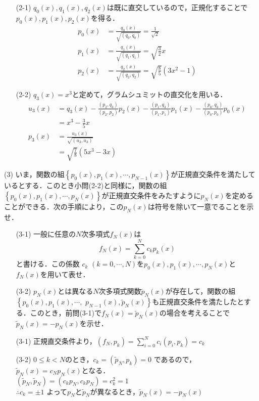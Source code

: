 \documentclass[a4j]{jarticle}
\let \ds \displaystyle
\begin{document}
\begin{itemize}
 \item[(2-1)] $q_0(x),q_1(x),q_2(x)$は既に直交しているので，正規化することで$p_0(x),p_1(x),p_2(x)$を得る．
              \begin{align*}
               p_0(x) &= \frac{q_0(x)}{\sqrt{(q_0,q_0)}} = \frac{1}{\sqrt{2}} \\
               p_1(x) &= \frac{q_1(x)}{\sqrt{(q_1,q_1)}} = \sqrt{\frac{3}{2}} x \\
               p_2(x) &= \frac{q_2(x)}{\sqrt{(q_2,q_2)}} = \sqrt{\frac{8}{5}} (3x^2-1)
              \end{align*}
 \item[(2-2)] $q_3(x)=x^3$と定めて，グラムシュミットの直交化を用いる．
              \begin{align*}
               u_3(x) &= q_3(x) - \frac{(p_2,q_3)}{(p_2,p_2)}p_2(x) - \frac{(p_1,q_3)}{(p_1,p_1)}p_1(x) - \frac{(p_0,q_3)}{(p_0,p_0)}p_0(x) \\
               &= x^3 - \frac{3}{5} x \\
               p_3(x) &= \frac{u_3(x)}{\sqrt{(u_3,u_3)}} \\
               &= \sqrt{\frac{7}{8}}(5x^3 - 3x)
              \end{align*}
\end{itemize}

\begin{screen}
 (3) いま，関数の組$\left\{p_0(x),p_1(x),\cdots,p_{N-1}(x)\right\}$が正規直交条件を満たしているとする．このとき小問(2-2)と同様に，関数の組$\left\{p_0(x),p_1(x),\cdots,p_{N}(x)\right\}$が正規直交条件をみたすように$p_N(x)$を定めることができる．次の手順により，この$p_N(x)$は符号を除いて一意でることを示せ．
 \begin{itemize}
  \item[(3-1)] 一般に任意の$N$次多項式$f_N(x)$は
               $$f_N(x)=\sum_{k=0}^Nc_kp_k(x)$$
               と書ける．この係数 $c_k$ $(k=0,\cdots,N)$を$p_0(x),p_1(x),\cdots,p_{N}(x)$と$f_N(x)$を用いて表せ．
  \item[(3-2)] $p_N(x)$とは異なる$N$次多項式関数$\tilde{p}_N(x)$が存在して，関数の組$\left\{p_0(x),p_1(x),\cdots,\right.$ $\left.p_{N-1}(x),\tilde{p}_{N}(x)\right\}$も正規直交条件を満たしたとする．このとき，前問(3-1)で$f_N(x)=\tilde{p}_N(x)$の場合を考えることで$\tilde{p}_N(x)=-p_N(x)$を示せ．
 \end{itemize}
\end{screen}

\begin{itemize}
 \item[(3-1)] 正規直交条件より，$\ds (f_N,p_k) = \sum_{i=0}^N c_i (p_i,p_k) = c_k$
 \item[(3-2)] $0 \leq k < N$のとき，$c_k = (\tilde{p}_N,p_k) = 0$ であるので，$\tilde{p}_N(x)=c_N p_N(x)$となる．\\ $(\tilde{p}_N,\tilde{p}_N)=(c_kp_N,c_kp_N)=c_k^2=1$ \\ $\therefore c_k = \pm 1$ \quad よって$p_N$と$\tilde{p}_N$が異なるとき，$\tilde{p}_N(x)=-p_N(x)$

               
\end{itemize}
\end{document}
